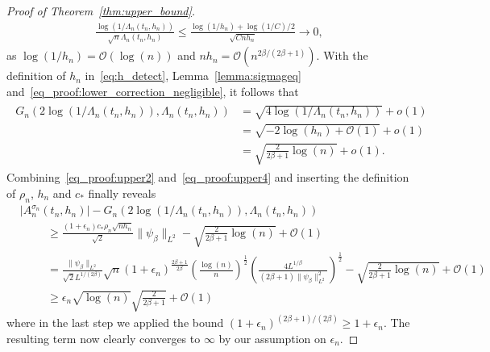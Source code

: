 \documentclass[10.5pt,letter]{article}
\numberwithin{equation}{section}
\theoremstyle{definition}
\newcommand{\1}{\mathbbm{1}}
\begin{document}
\begin{proof}[Proof of Theorem~\ref{thm:upper_bound}]
\begin{align}\label{eq_proof:lower_correction_negligible}
    \frac{\log(1/\Lambda_n(t_n,h_n))}{\sqrt{n} \Lambda_n(t_n,h_n)} \leq \frac{\log(1/h_n)+\log(1/C)/2}{\sqrt{Cn h_n}} \rightarrow 0,
\end{align} 
as $\log(1/h_n) = \mathcal{O}(\log(n))$ and $nh_n=\mathcal{O}(n^{2\beta/(2\beta+1)})$. With the definition of $h_n$ in~\eqref{eq:h_detect}, Lemma~\ref{lemma:sigmageq} and~\eqref{eq_proof:lower_correction_negligible}, it follows that
\begin{align}\label{eq_proof:upper4}
\begin{split}
    G_n(2\log(1/\Lambda_n(t_n,h_n)),\Lambda_n(t_n,h_n)) &= \sqrt{4\log(1/\Lambda_n(t_n,h_n))} + o(1) \\
    &= \sqrt{-2\log(h_n)+\mathcal{O}(1)} + o(1) \\
    &= \sqrt{\frac{2}{2\beta+1}\log(n)} + o(1).
\end{split}
\end{align}
Combining~\eqref{eq_proof:upper2} and~\eqref{eq_proof:upper4} and inserting the definition of $\rho_n$, $h_n$ and $c_*$ finally reveals
\begin{align*}
    &\big|A_n^{\sigma_n}(t_n,h_n)\big|-G_n(2\log(1/\Lambda_n(t_n,h_n)),\Lambda_n(t_n,h_n))   \\
    &\hspace{1cm} \geq \frac{(1+\epsilon_n)c_*\rho_n \sqrt{nh_n}}{\sqrt{2}}\|\psi_\beta\|_{L^2} - \sqrt{\frac{2}{2\beta+1}\log(n)}+ \mathcal{O}(1) \\
    &\hspace{1cm} = \frac{\|\psi_\beta\|_{L^2}}{\sqrt{2}L^{1/(2\beta)}} \sqrt{n} (1+\epsilon_n)^{\frac{2\beta+1}{2\beta}} \left(\frac{\log(n)}{n}\right)^\frac12 \left(\frac{4L^{1/\beta}}{(2\beta+1)\|\psi_\beta\|_{L^2}^2}\right)^\frac12 - \sqrt{\frac{2}{2\beta+1}\log(n)}+ \mathcal{O}(1) \\
    &\hspace{1cm} \geq \epsilon_n\sqrt{\log(n)} \sqrt{\frac{2}{2\beta+1}} + \mathcal{O}(1)
\end{align*}
where in the last step we applied the bound $(1+\epsilon_n)^{(2\beta+1)/(2\beta)}\geq 1+\epsilon_n$. The resulting term now clearly converges to $\infty$ by our assumption on $\epsilon_n$.\smallskip



\end{proof}
\end{document}
